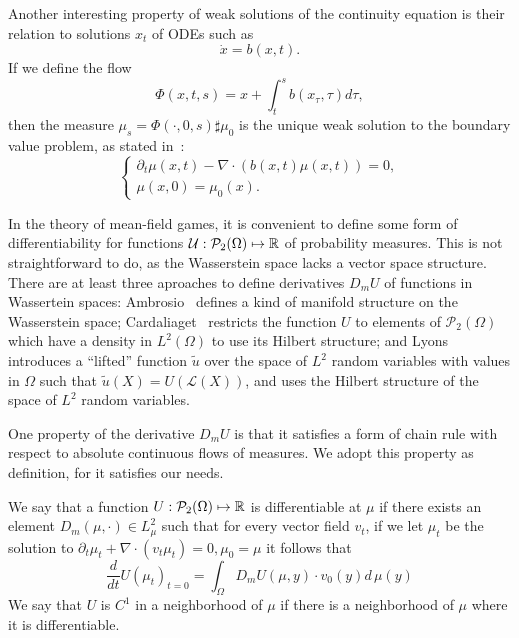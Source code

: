 Another interesting property of weak solutions of the continuity equation is their relation to solutions $x_t$ of ODEs such as
\begin{equation}
    \dot x = b(x,t).
\end{equation}
If we define the flow 
\begin{equation}
    \Phi(x,t,s) = x + \int_t^s b(x_\tau, \tau) d\tau, 
\end{equation}
then the measure $\mu_s = \Phi(\cdot, 0, s) \sharp \mu_0$ is the unique weak solution to the boundary value problem, as stated in~\cite{cardaliaguet2010notes}:
\begin{equation}
    \begin{cases}
        \partial_t \mu(x,t) - \nabla \cdot ( b(x,t) \mu(x,t) ) = 0,\\
        \mu(x,0) =  \mu_0(x). 
    \end{cases}
\end{equation}


In the theory of mean-field games, it is convenient to define some
form of differentiability for functions
 $\mathcal{U} : \mathcal{P}_2(\Omega) \mapsto \mathbb{R}$ of probability measures.
 This is not straightforward to do, as the Wasserstein space lacks a vector space
 structure.
There are at least three aproaches to define derivatives $D_m U$ of functions in
Wassertein spaces: 
Ambrosio~\cite{ambrosio2005gradient} defines a kind of manifold structure
on the Wasserstein space;
Cardaliaget~\cite{cardaliaguet2019master} restricts the 
function $U$ to elements of $\mathcal{P}_2(\Omega)$ which have a density in 
$L^2(\Omega)$ to use its Hilbert structure; and 
Lyons~\cite{cardaliaguet2010notes} introduces a ``lifted'' function $\tilde u$ over the space of $L^2$ random variables with values
in $\Omega$ such that $\tilde u(X) = U(\mathcal{L}(X))$, and uses the Hilbert structure
of the space of $L^2$ random variables.

One property of the derivative $D_m U$ is that it satisfies a form of chain rule with respect to absolute continuous flows of measures. We adopt this property as definition, for it satisfies our needs.
\begin{definition}
We say that a function $U : \mathcal{P}_2(\Omega) \mapsto \mathbb{R}$ is differentiable 
at $\mu$ if there exists an element $D_m(\mu, \cdot) \in L^2_\mu$
such that for every vector field $v_t$, if we let $\mu_t$ be the solution 
to $\partial_t \mu_t + \nabla \cdot(v_t \mu_t) = 0, \mu_0 = \mu$
it follows that
\begin{equation}\label{wass:measure_derivative_chain_rule}
    \frac{d}{dt} U{(\mu_t)}_{t = 0} = \int_\Omega D_m U(\mu, y) \cdot v_0(y) d\, \mu(y)
\end{equation}
We say that $U$ is $C^1$ in a neighborhood of $\mu$ if there is a neighborhood of $\mu$ where it is differentiable.
\end{definition}

